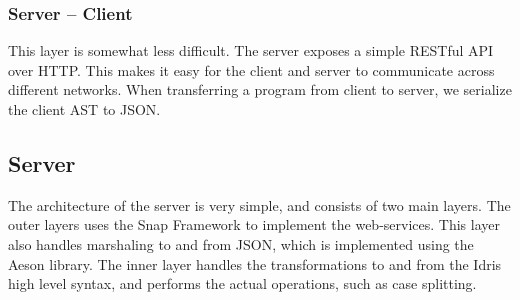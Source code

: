 \subsubsection{Server -- Client}
This layer is somewhat less difficult. The server exposes a simple RESTful API 
over HTTP\@. This makes it easy for the client and server to communicate across
different networks. When transferring a program from client to server, we
serialize the client AST to JSON\@.

\subsection{Server}
The architecture of the server is very simple, and consists of two main 
layers. The outer layers uses the Snap Framework to implement the 
web-services. This layer also handles marshaling to and from JSON\@, which is 
implemented using the Aeson library. The inner layer handles the 
transformations to and from the Idris high level syntax, and performs the 
actual operations, such as case splitting.

